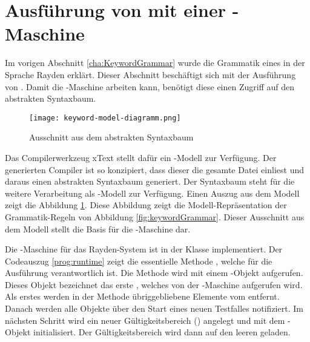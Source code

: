 
\section{Ausführung von  mit einer -Maschine}
\label{cha:StackMachine}

Im vorigen Abschnitt \ref{cha:KeywordGrammar} wurde die Grammatik eines  in der Sprache Rayden erklärt. Dieser Abschnitt beschäftigt sich mit der Ausführung von . Damit die -Maschine arbeiten kann, benötigt diese einen Zugriff auf den abstrakten Syntaxbaum. 

\begin{figure}
\centering
\texttt{[image: keyword-model-diagramm.png]}
\caption{Ausschnitt aus dem abstrakten Syntaxbaum}
\label{fig:AST}
\end{figure}

\SuperPar
Das Compilerwerkzeug xText stellt dafür ein -Modell zur Verfügung. Der generierten Compiler ist so konzipiert, dass dieser die gesamte Datei einliest und daraus einen abstrakten Syntaxbaum generiert. Der Syntaxbaum steht für die weitere Verarbeitung als -Modell zur Verfügung. Einen Auszug aus dem Modell zeigt die Abbildung \ref{fig:AST}. Diese Abbildung zeigt die Modell-Repräsentation der Grammatik-Regeln von Abbildung \ref{fig:keywordGrammar}. Dieser Ausschnitt aus dem Modell stellt die Basis für die -Maschine dar. 

\SuperPar
Die -Maschine für das Rayden-System ist in der Klasse  implementiert. Der Codeauszug \ref{prog:runtime} zeigt die essentielle Methode , welche für die Ausführung verantwortlich ist. Die Methode wird mit einem -Objekt aufgerufen. Dieses Objekt bezeichnet das erste , welches von der -Maschine aufgerufen wird. Als erstes werden in der Methode übriggebliebene Elemente vom  entfernt. Danach werden alle Objekte über den Start eines neuen Testfalles notifiziert. Im nächsten Schritt wird ein neuer Gültigkeitsbereich () angelegt und mit dem -Objekt initialisiert. Der Gültigkeitsbereich wird dann auf den leeren  geladen. 

